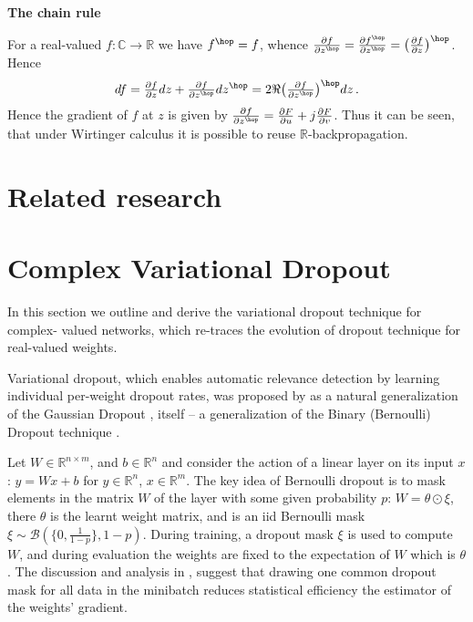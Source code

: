 \documentclass[a4paper,10pt]{article}
\newcommand{\important}[1]{\textbf{\color{red} #1}}
\newcommand{\todo}{\important}  %
\newcommand{\real}{\mathbb{R}}
\newcommand{\cplx}{\mathbb{C}}
\begin{document}
\todo{The chain rule}

For a real-valued $f\colon \cplx \to \real$ we have $f^\hop = f$, whence $
  \tfrac{\partial f}{\partial z^\hop}
    = \tfrac{\partial f^\hop}{\partial z^\hop}
    = \bigl(\tfrac{\partial f}{\partial z} \bigr)^\hop
$. Hence
$$
df
  = \tfrac{\partial f}{\partial z} dz
    + \tfrac{\partial f}{\partial z^\hop} dz^\hop
  = 2 \Re \bigl( \tfrac{\partial f}{\partial z^\hop} \bigr)^\hop dz
  \,. $$
Hence the gradient of $f$ at $z$ is given by $
  \tfrac{\partial f}{\partial z^\hop}
    = \tfrac{\partial F}{\partial u}
      + j \tfrac{\partial F}{\partial v}
$. Thus it can be seen, that under Wirtinger calculus it is possible to reuse $\real$-backpropagation.



\section{Related research} %
\label{sec:realted_research}



\section{Complex Variational Dropout} %
\label{sec:complex_varaitional_dropout}

In this section we outline and derive the variational dropout technique for complex-%
valued networks, which re-traces the evolution of dropout technique for real-valued
weights.

Variational dropout, which enables automatic relevance detection by learning individual
per-weight dropout rates, was proposed by \cite{kingma_variational_2015} as a natural
generalization of the Gaussian Dropout \cite{srivastava_dropout_2014,wang_fast_2013},
itself -- a generalization of the Binary (Bernoulli) Dropout technique \cite{hinton_improving_2012}.

Let $W \in\real^{n\times m}$, and $b\in \real^n$ and consider the action of a linear
layer on its input $x$: $y = W x + b$ for $y\in \real^n$, $x\in \real^m$. The key idea
of Bernoulli dropout is to mask elements in the matrix $W$ of the layer with some given
probability $p$: $W = \theta \odot \xi$, there $\theta$ is the learnt weight matrix,
and is an iid Bernoulli mask $\xi \sim \mathcal{B}(\{0, \tfrac1{1-p}\}, 1-p)$. During
training, a dropout mask $\xi$ is used to compute $W$, and during evaluation the weights
are fixed to the expectation of $W$ which is $\theta$. The discussion and analysis in
\cite{kingma_variational_2015}, suggest that drawing one common dropout mask for all
data in the minibatch reduces statistical efficiency the estimator of the weights'
gradient.
\end{document}
